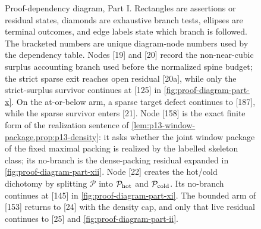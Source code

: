\documentclass[11pt]{article}
\begin{document}
\begin{figure}[p]
{%
}
\caption[Proof-dependency diagram, Part I]{Proof-dependency diagram, Part I.  Rectangles are assertions or residual states, diamonds are exhaustive branch tests, ellipses are terminal outcomes, and edge labels state which branch is followed.  The bracketed numbers are unique diagram-node numbers used by the dependency table.  Nodes [19] and [20] record the non-near-cubic surplus accounting branch used before the normalized spine budget; the strict sparse exit reaches open residual [20a], while only the strict-surplus survivor continues at [125] in \cref{fig:proof-diagram-part-x}.  On the at-or-below arm, a sparse target defect continues to [187], while the sparse survivor enters [21].  Node [158] is the exact finite form of the realization sentence of \cref{lem:p13-window-package,prop:p13-density}: it asks whether the joint window package of the fixed maximal packing is realized by the labelled skeleton class; its no-branch is the dense-packing residual expanded in \cref{fig:proof-diagram-part-xii}.  Node [22] creates the hot/cold dichotomy by splitting $\mathcal P$ into $\mathcal P_{\rm hot}$ and $\mathcal P_{\rm cold}$.  Its no-branch continues at [145] in \cref{fig:proof-diagram-part-xi}.  The bounded arm of [153] returns to [24] with the density cap, and only that live residual continues to [25] and \cref{fig:proof-diagram-part-ii}.}
\label{fig:proof-diagram-part-i}
\end{figure}
\end{document}
